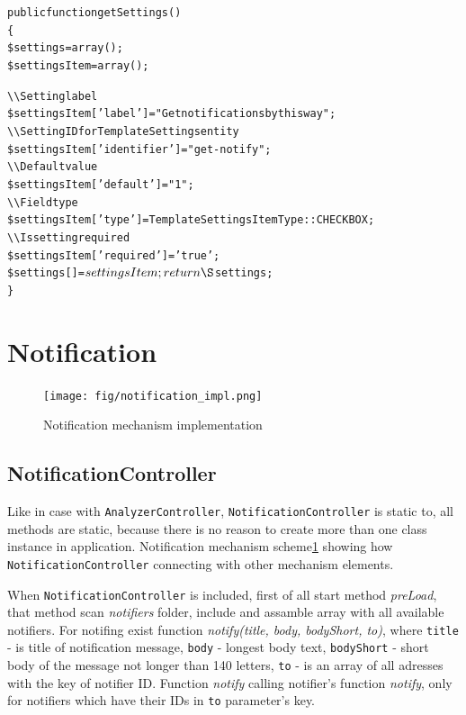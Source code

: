 \begin{alltt}
public function getSettings()
\{
    \$settings = array();
    \$settingsItem = array();

    \textbackslash\textbackslash Setting label
    \$settingsItem['label'] = "Get notifications by this way";
    \textbackslash\textbackslash Setting ID for TemplateSettings entity
    \$settingsItem['identifier'] = "get-notify";
    \textbackslash\textbackslash Default value
    \$settingsItem['default'] = "1";
    \textbackslash\textbackslash Field type
    \$settingsItem['type'] = TemplateSettingsItemType::CHECKBOX;
    \textbackslash\textbackslash Is setting required
    \$settingsItem['required'] = 'true';
    \$settings[] = $settingsItem;

    return \S$settings; 
\}
\end{alltt}

\section{Notification}

\begin{figure}[hb]
  \centering
    \texttt{[image: fig/notification\_impl.png]}
  \caption{Notification mechanism implementation}
  \label{fig:not_impl}
\end{figure}

\subsection{NotificationController}

Like in case with \texttt{AnalyzerController}, \texttt{NotificationController} is static to, all methods are static, because there is no reason to create more than one class instance in application. Notification mechanism scheme\ref{fig:not_impl} showing how \texttt{NotificationController} connecting with other mechanism elements.

When \texttt{NotificationController} is included, first of all start method \emph{preLoad}, that method scan \emph{notifiers} folder, include and assamble array with all available notifiers. For notifing exist function \emph{notify(title, body, bodyShort, to)}, where \texttt{title} - is title of notification message, \texttt{body} - longest body text, \texttt{bodyShort} - short body of the message not longer than 140 letters, \texttt{to} - is an array of all adresses with the key of notifier ID. Function \emph{notify} calling notifier's function \emph{notify}, only for notifiers which have their IDs in \texttt{to} parameter's key.

